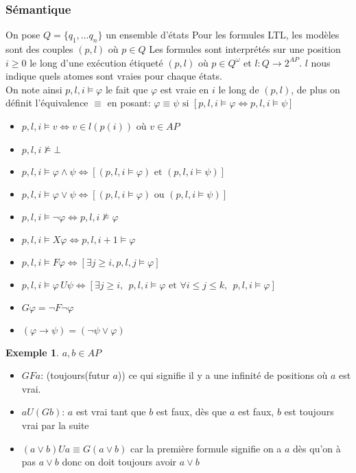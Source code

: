 \documentclass[12pt,a4paper]{article}
\theoremstyle{plain}
\theoremstyle{definition}
\newtheorem{ex}{Exemple}
\begin{document}
\subsubsection{Sémantique}
On pose $Q=\{q_1, \dots q_n\}$ un ensemble d'états  Pour les formules LTL, les modèles sont des couples $(p, l)$ où $p \in Q$
Les formules sont interprétés sur une position $i \geq 0$ le long d'une exécution étiqueté $(p, l)$ où $p \in Q^{\omega}$ et $l : Q \to 2^{AP}$. $l$ nous indique quels atomes sont vraies pour chaque états. \\
On note ainsi $p, l, i \models \varphi$ le fait que $\varphi$ est vraie en $i$ le long de $(p, l)$, de plus on définit l'équivalence $\equiv$ en posant: $\varphi \equiv \psi \textrm{ si } [p,l,i \models \varphi \Leftrightarrow p,l,i \models \psi]$
\begin{itemize}
	\item[] $p, l, i \models v \Leftrightarrow v \in l(p(i))$ où $v \in AP$
	\item[] $p,l,i \not \models \bot$
	\item[] $p, l, i \models \varphi \land \psi \Leftrightarrow [(p,l,i \models \varphi) \textrm{ et } (p,l,i \models \psi)]$
	\item[] $p,l,i \models \varphi \lor \psi \Leftrightarrow [(p,l,i \models \varphi)\textrm{ ou } (p,l,i \models \psi)]$
	\item[] $p,l,i \models \lnot \varphi \Leftrightarrow p,l,i \not \models \varphi$
	\item[] $p,l,i \models X\varphi \Leftrightarrow p,l,i+1 \models \varphi$
	\item[] $p,l,i \models F\varphi \Leftrightarrow [\exists j \geq i, p,l,j \models \varphi]$
	\item[] $p,l,i \models \varphi\, U \psi \Leftrightarrow [\exists j \geq i, \:\: p,l,i \models \varphi \textrm{ et } \forall i \leq j \leq k, \:\: p,l,i\models \varphi]$
	\item[] $G\varphi = \lnot F \lnot \varphi$
	\item[] $(\varphi \to \psi) = (\lnot \psi \lor \varphi)$
	
\end{itemize}
\vspace*{2mm}
\begin{ex} 
	\leavevmode \newline
	$a, b \in AP$
	\begin{itemize}
		\item $GFa$: (toujours(futur $a$)) ce qui signifie il y a une infinité de positions où $a$ est vrai.
		\item $aU(Gb)$: $a$ est vrai tant que $b$ est faux, dès que $a$ est faux, $b$ est toujours vrai par la suite
		\item $(a\lor b ) U a \equiv G(a \lor b)$ car la première formule signifie on a $a$ dès qu'on à pas $a\lor b$ donc on doit toujours avoir $a \lor b$
	\end{itemize}
\end{ex}
\end{document}
